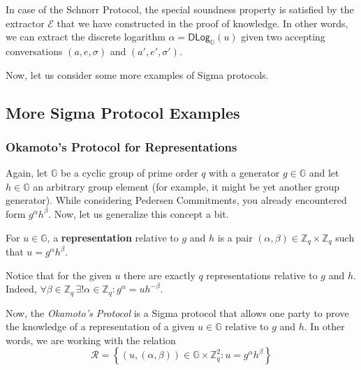 \documentclass[../lecture-notes-148x210.tex]{subfiles}
\begin{document}
\begin{example}
    In case of the Schnorr Protocol, the special soundness property is satisfied by the extractor $\mathcal{E}$ that we have constructed in the proof of knowledge. In other words, we can extract the discrete logarithm $\alpha = \mathsf{DLog}_{\mathbb{G}}(u)$ given two accepting conversations $(a,e,\sigma)$ and $(a',e',\sigma')$.
\end{example}

Now, let us consider some more examples of Sigma protocols.

\subsection{More Sigma Protocol Examples}

\subsubsection{Okamoto's Protocol for Representations}\label{section:okamoto_protocol}

Again, let $\mathbb{G}$ be a cyclic group of prime order $q$ with a generator $g \in \mathbb{G}$ and let $h \in \mathbb{G}$ an arbitrary group element (for example, it might be yet another group generator). While considering Pedersen Commitments, you already encountered form $g^{\alpha}h^{\beta}$. Now, let us generalize this concept a bit.

\begin{definition}
    For $u \in \mathbb{G}$, a \textbf{representation} relative to $g$ and $h$ is a pair $(\alpha,\beta) \in \mathbb{Z}_q \times \mathbb{Z}_q$ such that $u=g^{\alpha}h^{\beta}$.
\end{definition}

\begin{remark}
    Notice that for the given $u$ there are exactly $q$ representations relative to $g$ and $h$. Indeed, $\forall \beta \in \mathbb{Z}_q \, \exists! \alpha \in \mathbb{Z}_q: g^{\alpha} = uh^{-\beta}$. 
\end{remark}

Now, the \textit{Okamoto's Protocol} is a Sigma protocol that allows one party to prove the knowledge of a representation of a given $u \in \mathbb{G}$ relative to $g$ and $h$. In other words, we are working with the relation
\begin{equation*}
    \mathcal{R} = \left\{ (u,(\alpha,\beta)) \in \mathbb{G} \times \mathbb{Z}_q^2: u = g^{\alpha}h^{\beta} \right\}
\end{equation*}
\end{document}
